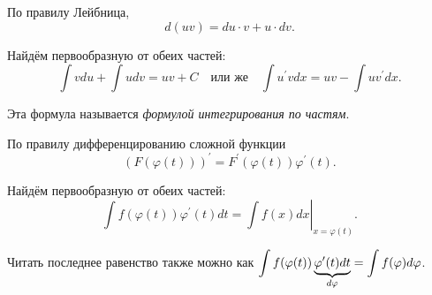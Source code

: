 По правилу Лейбница,
\[
    d(uv) = du \cdot v + u \cdot dv.
\]

Найдём первообразную от обеих частей:
\[
    \int vdu + \int udv = uv + C\quad\text{или же}\quad\int u^\prime vdx = uv - \int u v^\prime dx.
\]

Эта формула называется \textit{формулой интегрирования по частям}.

По правилу дифференцированию сложной функции
\[
    (F(\varphi(t)))^\prime = F^\prime(\varphi(t))\varphi^\prime(t).
\]

Найдём первообразную от обеих частей:
\[
    \int f(\varphi(t))\varphi^\prime(t)dt = \left.\int f(x)dx\right\vert_{x = \varphi(t)}.
\]

Читать последнее равенство также можно как $\displaystyle\int f(\varphi(t))\underbrace{\varphi^\prime(t)dt}_{d\varphi} = \int f(\varphi)d\varphi$.

